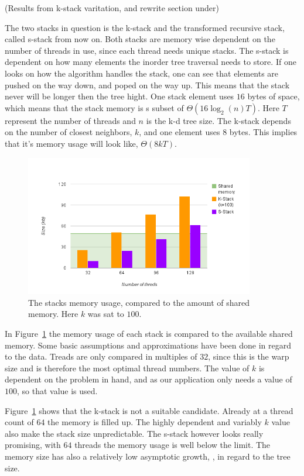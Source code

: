 (Results from k-stack varitation, and rewrite section under)

The two stacks in question is the k-stack and the transformed recursive stack, called s-stack from now on. Both stacks are memory wise dependent on the number of threads in use, since each thread needs unique stacks. The s-stack is dependent on how many elements the inorder tree traversal needs to store. If one looks on how the algorithm handles the stack, one can see that elements are pushed on the way down, and poped on the way up.  This means that the stack never will be longer then the tree hight. One stack element uses $16$ bytes of space, which means that the stack memory is s subset of $\Theta(16\log_2(n)T)$. Here $T$ represent the number of threads and $n$ is the k-d tree size. The k-stack depends on the number of closest neighbors, $k$, and one element uses $8$ bytes. This implies that it's memory usage will look like, $\Theta(8kT)$.


\begin{figure}[ht!]
\centering
\includegraphics[width=100mm]{../gfx/shared_memory_and_stack.png}

\caption{The stacks memory usage, compared to the amount of shared memory. Here $k$ was sat to $100$.}
\label{fig:stacks_and_shared_memory}
\end{figure}


In Figure~\ref{fig:stacks_and_shared_memory} the memory usage of each stack is compared to the available shared memory. Some basic assumptions and approximations have been done in regard to the data. Treads are only compared in multiples of $32$, since this is the warp size and is therefore the most optimal thread numbers. The value of $k$ is dependent on the problem in hand, and as our application only needs a value of $100$, so that value is used. 


Figure~\ref{fig:stacks_and_shared_memory} shows that the k-stack is not a suitable candidate. Already at a thread count of $64$ the memory is filled up. The highly dependent and variably $k$ value also make the stack size unpredictable. The s-stack however looks really promising, with $64$ threads the memory usage is well below the limit. The memory size has also a relatively low asymptotic growth, , in regard to the tree size.

